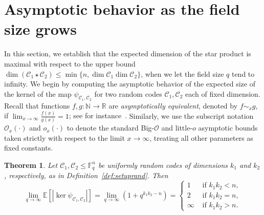 \documentclass[a4paper,11pt,reqno]{article}
\newcommand{\F}{\mathbb{F}}
\newcommand{\E}{\mathbb E}
\newcommand{\C}{\mathcal{C}}
\newcommand{\NN}{\mathbb N}
\theoremstyle{plain} \numberwithin{equation}{section}
\newtheorem{theorem}{Theorem}[section]
\theoremstyle{definition}
\begin{document}
\section{Asymptotic behavior as the field size grows}
\label{sec:asympq}

In this section, we establish that the expected dimension of the star product is maximal with respect to the upper bound $\dim(\C_1 \star \C_2) \leq \min\{n,\dim \C_1 \dim \C_2\}$, when we let the field size $q$ tend to infinity. We begin by computing the asymptotic behavior of the expected size of the kernel of the map $\psi_{\C_1, \C_2}$ for two random codes $\C_1, \C_2$ each of fixed dimension. Recall that functions $f,g \colon \NN \rightarrow \mathbb{R}$ are \emph{asymptotically equivalent}, denoted by $f\sim_x g$, if $\lim_{x\rightarrow \infty} \frac{f(x)}{g(x)}=1$; see for instance~\cite{debruijn}. {  Similarly, we use the subscript notation $\mathcal{O}_x(\cdot)$ and $o_x(\cdot)$ to denote the standard Big-$\mathcal{O}$ and little-$o$ asymptotic bounds taken strictly with respect to the limit $x \to \infty$, treating all other parameters as fixed constants.}


\begin{theorem} \label{thm:qlimit} 
    Let $\C_1, \C_2 \leq \F_q^n$ be uniformly random codes of dimensions $k_1$ and $k_2$, respectively, as in Definition~\ref{def:setuprand}. Then
$$\lim_{q \rightarrow \infty} \E[|\ker \psi_{\C_1, \C_2}|] = \lim_{q\rightarrow \infty} (1 + q^{k_1k_2-n}) = \begin{cases}
    1 &\text{ if } k_1k_2 < n,\\
    2 &\text{ if } k_1k_2 = n,\\
     \infty &\text{ if } k_1k_2 > n.
\end{cases}$$

\end{theorem}
\end{document}

